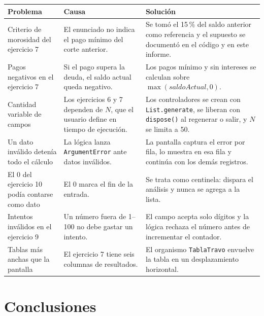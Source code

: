 \documentclass[12pt,a4paper]{article}
\begin{document}
\begin{center}
\small
\begin{tabular}{|p{3.4cm}|p{5.6cm}|p{5.6cm}|}
\hline
\textbf{Problema} & \textbf{Causa} & \textbf{Solución} \\ \hline
Criterio de morosidad del ejercicio 7 & El enunciado no indica el pago mínimo del corte anterior. & Se tomó el 15\,\% del saldo anterior como referencia y el supuesto se documentó en el código y en este informe. \\ \hline
Pagos negativos en el ejercicio 7 & Si el pago supera la deuda, el saldo actual queda negativo. & Los pagos mínimo y sin intereses se calculan sobre $\max(saldoActual, 0)$. \\ \hline
Cantidad variable de campos & Los ejercicios 6 y 7 dependen de $N$, que el usuario define en tiempo de ejecución. & Los controladores se crean con \texttt{List.generate}, se liberan con \texttt{dispose()} al regenerar o salir, y $N$ se limita a 50. \\ \hline
Un dato inválido detenía todo el cálculo & La lógica lanza \texttt{ArgumentError} ante datos inválidos. & La pantalla captura el error por fila, lo muestra en esa fila y continúa con los demás registros. \\ \hline
El 0 del ejercicio 10 podía contarse como dato & El 0 marca el fin de la entrada. & Se trata como centinela: dispara el análisis y nunca se agrega a la lista. \\ \hline
Intentos inválidos en el ejercicio 9 & Un número fuera de 1--100 no debe gastar un intento. & El campo acepta solo dígitos y la lógica rechaza el número antes de incrementar el contador. \\ \hline
Tablas más anchas que la pantalla & El ejercicio 7 tiene seis columnas de resultados. & El organismo \texttt{TablaTravo} envuelve la tabla en un desplazamiento horizontal. \\ \hline
\end{tabular}
\end{center}

\section{Conclusiones}
\end{document}
